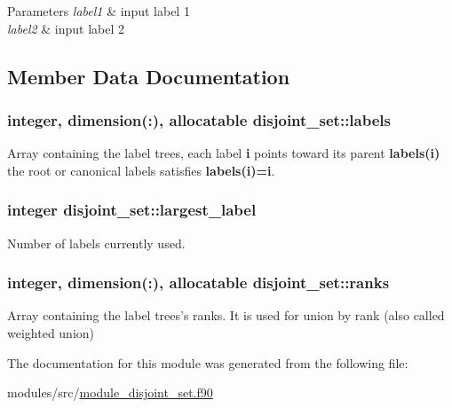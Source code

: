 \begin{DoxyParams}{\-Parameters}
{\em label1} & input label 1 \\
\hline
{\em label2} & input label 2 \\
\hline
\end{DoxyParams}


\subsection{\-Member \-Data \-Documentation}
\hypertarget{classdisjoint__set_a83aa2507f2114f339d1d6db1962be0a5}{
\subsubsection[{labels}]{\setlength{\rightskip}{0pt plus 5cm}integer, dimension(\-:), allocatable {\bf disjoint\-\_\-set\-::labels}}}
\label{classdisjoint__set_a83aa2507f2114f339d1d6db1962be0a5}


\-Array containing the label trees, each label {\bfseries i} points toward its parent {\bfseries labels(i)} the root or canonical labels satisfies {\bfseries labels(i)=i}. 

\hypertarget{classdisjoint__set_a2a38373e2aad581740cb09ecf192d3b1}{
\subsubsection[{largest\-\_\-label}]{\setlength{\rightskip}{0pt plus 5cm}integer {\bf disjoint\-\_\-set\-::largest\-\_\-label}}}
\label{classdisjoint__set_a2a38373e2aad581740cb09ecf192d3b1}


\-Number of labels currently used. 

\hypertarget{classdisjoint__set_aa2cdbf9649ea65c9f319db6efcccbd2d}{
\subsubsection[{ranks}]{\setlength{\rightskip}{0pt plus 5cm}integer, dimension(\-:), allocatable {\bf disjoint\-\_\-set\-::ranks}}}
\label{classdisjoint__set_aa2cdbf9649ea65c9f319db6efcccbd2d}


\-Array containing the label trees's ranks. \-It is used for union by rank (also called weighted union) 



\-The documentation for this module was generated from the following file\-:\begin{DoxyCompactItemize}
\item 
modules/src/\hyperlink{module__disjoint__set_8f90}{module\-\_\-disjoint\-\_\-set.\-f90}\end{DoxyCompactItemize}
